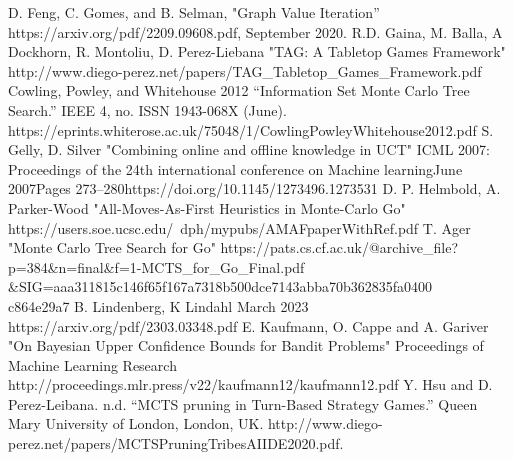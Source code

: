 \documentclass[conference]{IEEEtran}
\begin{document}
\begin{thebibliography}{00}
 D. Feng, C. Gomes, and B. Selman, "Graph Value Iteration'' https://arxiv.org/pdf/2209.09608.pdf, September 2020.
 R.D. Gaina, M. Balla, A Dockhorn, R. Montoliu, D. Perez-Liebana "TAG: A Tabletop Games Framework" http://www.diego-perez.net/papers/TAG\_Tabletop\_Games\_Framework.pdf
 Cowling, Powley, and Whitehouse 2012  “Information Set Monte Carlo Tree Search.” IEEE 4, no. ISSN 1943-068X (June). https://eprints.whiterose.ac.uk/75048/1/CowlingPowleyWhitehouse2012.pdf
 S. Gelly, D. Silver "Combining online and offline knowledge in UCT" ICML 2007: Proceedings of the 24th international conference on Machine learningJune 2007Pages 273–280https://doi.org/10.1145/1273496.1273531
 D. P. Helmbold, A. Parker-Wood "All-Moves-As-First Heuristics in Monte-Carlo Go" https://users.soe.ucsc.edu/~dph/mypubs/AMAFpaperWithRef.pdf
 T. Ager "Monte Carlo Tree Search for Go" https://pats.cs.cf.ac.uk/@archive\_file?p=384&n=final&f=1-MCTS\_for\_Go\_Final.pdf\\\&SIG=aaa311815c146f65f167a7318b500dce7143abba70b362835fa0400\\c864e29a7
B. Lindenberg, K Lindahl March 2023 https://arxiv.org/pdf/2303.03348.pdf
E. Kaufmann, O. Cappe and A. Gariver "On Bayesian Upper Confidence Bounds for Bandit Problems" Proceedings of Machine Learning Research http://proceedings.mlr.press/v22/kaufmann12/kaufmann12.pdf
Y. Hsu and D. Perez-Leibana. n.d. “MCTS pruning in Turn-Based Strategy Games.” Queen Mary University of London, London, UK. http://www.diego-perez.net/papers/MCTSPruningTribesAIIDE2020.pdf.
\end{thebibliography}
\vspace{12pt}
\end{document}
